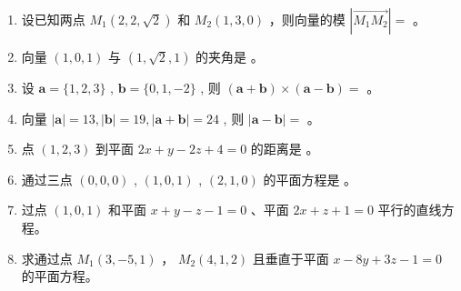 \documentclass[12pt, a4paper]{article}
\begin{document}
\begin{enumerate}
    \item 设已知两点 $ M_{1}(2,2,\sqrt{2}) $ 和 $ M_{2}(1,3,0) $ ，则向量的模 $ \left|\overrightarrow{M_{1}M_{2}}\right|= $ \underline{\hspace{2cm}}。

    \item 向量 $ (1,0,1) $ 与 $ (1,\sqrt{2},1) $ 的夹角是 \underline{\hspace{2cm}}。

    \item 设 $ \mathbf{a} = \{1, 2, 3\} $ , $ \mathbf{b} = \{0, 1, -2\} $ , 则 $ (\mathbf{a} + \mathbf{b}) \times (\mathbf{a} - \mathbf{b}) = $ \underline{\hspace{2cm}}。

    \item 向量 $ \left|\mathbf{a}\right|=13,\left|\mathbf{b}\right|=19,\left|\mathbf{a}+\mathbf{b}\right|=24 $ , 则 $ \left|\mathbf{a}-\mathbf{b}\right|= $ \underline{\hspace{2cm}}。

    \item 点 $ (1,2,3) $ 到平面 $ 2x + y - 2z + 4 = 0 $ 的距离是 \underline{\hspace{2cm}}。

    \item 通过三点 $ (0,0,0) $ , $ (1,0,1) $ , $ (2,1,0) $ 的平面方程是 \underline{\hspace{2cm}}。

    \item 过点 $ (1,0,1) $ 和平面 $ x+y-z-1=0 $ 、平面 $ 2x+z+1=0 $ 平行的直线方程。

    \item 求通过点 $ M_{1}(3,-5,1) $ ， $ M_{2}(4,1,2) $ 且垂直于平面 $ x-8y+3z-1=0 $ 的平面方程。
\end{enumerate}
\end{document}
